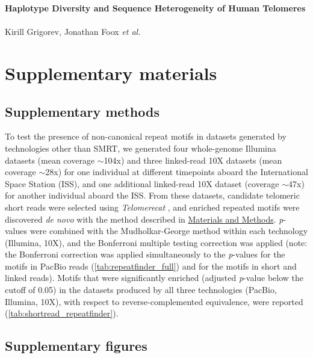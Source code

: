 \documentclass{article}
\begin{document}
\singlespacing
{}
\begin{center}
    \LARGE{\textbf{Haplotype Diversity and Sequence Heterogeneity of Human Telomeres}}
    \\~\\
    \small{Kirill Grigorev, Jonathan Foox \textit{et al.}}
\section*{Supplementary materials}
\end{center}
\doublespacing

\subsection*{Supplementary methods}  \label{sec:supp_methods}

To test the presence of non-canonical repeat motifs in datasets generated by technologies other than SMRT,
we generated four whole-genome Illumina datasets (mean coverage $\sim$104x)
and three linked-read 10X datasets (mean coverage $\sim$28x)
for one individual at different timepoints aboard the International Space Station (ISS),
and one additional linked-read 10X dataset (coverage $\sim$47x) for another individual aboard the ISS.
From these datasets, candidate telomeric short reads were selected using \textit{Telomerecat} \cite{telomerecat},
and enriched repeated motifs were discovered \textit{de novo} with the method described in \hyperref[sec:methods]{Materials and Methods}.
\textit{p}-values were combined with the Mudholkar-George method \cite{george} within each technology (Illumina, 10X),
and the Bonferroni multiple testing correction was applied
(note: the Bonferroni correction was applied simultaneously to the \textit{p}-values for the motifs in PacBio reads (\autoref{tab:repeatfinder_full}) and for the motifs in short and linked reads).
Motifs that were significantly enriched (adjusted \textit{p}-value below the cutoff of 0.05) in the datasets produced by all three technologies (PacBio, Illumina, 10X), with respect to reverse-complemented equivalence, were reported (\autoref{tab:shortread_repeatfinder}).

\pagebreak

\subsection*{Supplementary figures}  \label{sec:supp_figs}
\end{document}
